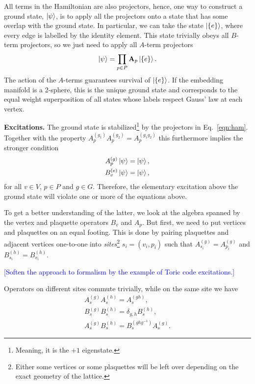 \documentclass[two column]{article}
\newcommand{\caro}[1]{\textcolor{red}{[#1]}}
\newcommand{\jovan}[1]{\textcolor{blue}{[#1]}}
\begin{document}
All terms in the Hamiltonian are also projectors, hence, one way to construct a ground state, $\ket{\psi}$, is to apply all the projectors onto a state that has some overlap with the ground state. In particular, we can take the state $\ket{\{e\}}$, where every edge is labelled by the identity element.
This state trivially obeys all $B$-term projectors, so we just need to apply all $A$-term projectors
\begin{equation}
    \ket{\psi} = \prod_{p \in P} \mathbf A_p \ket{\{e\}}.
\end{equation}
The action of the $A$-terms guarantees survival of $\ket{\{e\}}$. If the embedding manifold is a 2-sphere, this is the unique ground state and corresponds to the equal weight superposition of all states whose labels respect Gauss' law at each vertex.






\textbf{Excitations.} The ground state is stabilized\footnote{Meaning, it is the $+1$ eigenstate.} by the projectors in Eq.~\eqref{eqn:ham}. Together with the property $A_p^{(g_1)}A_p^{(g_2)} = A_p^{(g_1 g_2)}$ this furthermore implies the stronger condition
\begin{equation}
\begin{split}
    A^{(g)}_p \ket{\psi} = \ket{\psi},\\
    B^{(e)}_v \ket{\psi} = \ket{\psi},
\end{split}\label{eqn:ground_state}
\end{equation}
for all $v \in V$, $p \in P$ and $g \in G$. Therefore, the elementary excitation above the ground state will violate one or more of the equations above.

To get a better understanding of the latter, we look at the algebra spanned by the vertex and plaquette operators $B_v$ and $A_p$. But first, we need to put vertices and plaquettes on an equal footing. This is done by pairing plaquettes and adjacent vertices one-to-one into \emph{sites}\footnote{Either some vertices or some plaquettes will be left over depending on the exact geometry of the lattice.} $s_i = (v_i, p_i)$ such that $A_{s_i}^{(g)} = A_{p_i}^{(g)}$ and $B_{s_i}^{(h)} = B_{v_i}^{(h)}$. 

\jovan{Soften the approach to formalism by the example of Toric code excitations.}

Operators on different sites commute trivially, while on the same site we have 
\begin{equation}
    \begin{split}
        A_s^{(g)}A_s^{(h)} = A_s^{(gh)}, \\
        B_s^{(g)}B_s^{(h)} = \delta_{g,h} B_s^{(h)},\\
        A_s^{(g)}B_s^{(h)} = B_s^{(ghg^{-1})}A_s^{(g)}.
    \end{split}\label{eqn:alg}
\end{equation}
\end{document}
